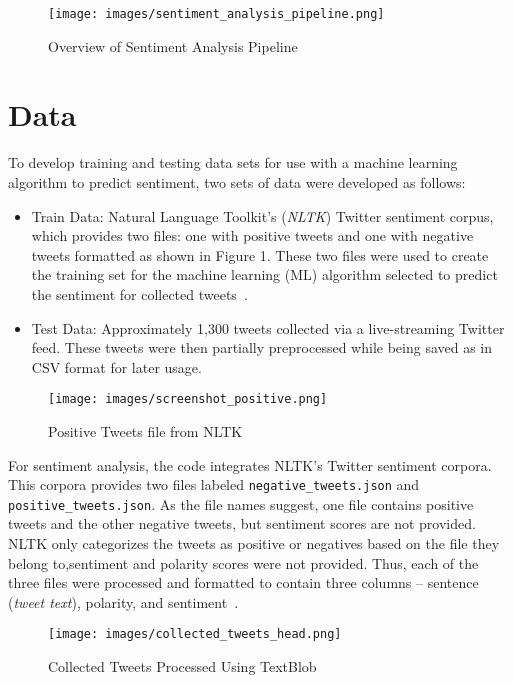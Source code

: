 \begin{figure}[H]
\centering
\texttt{[image: images/sentiment\_analysis\_pipeline.png]}
\caption{Overview of Sentiment Analysis Pipeline}
\label{fig:pipeline}
\end{figure}

\section{Data} 

To develop training and testing data sets for use
with a machine learning algorithm to predict
sentiment, two sets of data were developed as follows:

\begin{itemize}
\item Train Data:  Natural Language Toolkit's
(\emph{NLTK}) Twitter sentiment corpus, which
provides two files:  one with positive tweets and one
with negative tweets formatted as shown in Figure 1.
These two files were used to create the training set
for the machine learning (ML) algorithm selected to
predict the sentiment for collected tweets~\cite{twitter14}.

\item Test Data:  Approximately 1,300 tweets collected via a
live-streaming Twitter feed.  These tweets were then partially
preprocessed while being saved as in CSV format for later usage.
\end{itemize}

\begin{figure}[H]
\centering
\texttt{[image: images/screenshot\_positive.png]}
\caption{Positive Tweets file from NLTK}
\label{fig:positive}
\end{figure} 

For sentiment analysis, the code integrates NLTK's Twitter sentiment corpora.  
This corpora provides two files labeled
\verb|negative_tweets.json| and \verb|positive_tweets.json|.  As
the file names suggest, one file contains positive tweets and
the other negative tweets, but sentiment scores are not provided.
NLTK only categorizes the tweets as
positive or negatives based on the file they belong to,sentiment
and polarity scores were not
provided.  Thus, each of the three files were processed and
formatted to contain three columns --
sentence (\emph{tweet text}), polarity, and sentiment~\cite{twitter_analysis}. 

\begin{figure}[H]
\centering
\texttt{[image: images/collected\_tweets\_head.png]}
\caption{Collected Tweets Processed Using TextBlob}
\label{fig:textblob_tweets}
\end{figure} 

